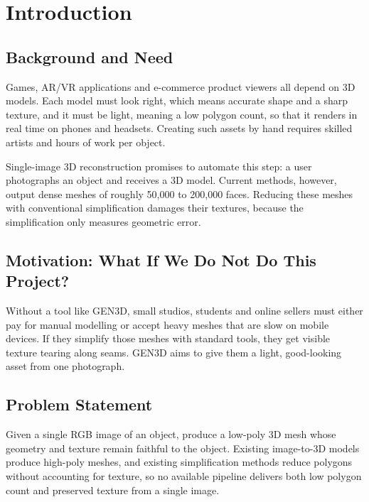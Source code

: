 \chapter{Introduction}

\section{Background and Need}
Games, AR/VR applications and e-commerce product viewers all depend on 3D models. Each model must look right, which means accurate shape and a sharp texture, and it must be light, meaning a low polygon count, so that it renders in real time on phones and headsets. Creating such assets by hand requires skilled artists and hours of work per object.

Single-image 3D reconstruction promises to automate this step: a user photographs an object and receives a 3D model. Current methods, however, output dense meshes of roughly 50{,}000 to 200{,}000 faces. Reducing these meshes with conventional simplification damages their textures, because the simplification only measures geometric error.

\section{Motivation: What If We Do Not Do This Project?}
Without a tool like GEN3D, small studios, students and online sellers must either pay for manual modelling or accept heavy meshes that are slow on mobile devices. If they simplify those meshes with standard tools, they get visible texture tearing along seams. GEN3D aims to give them a light, good-looking asset from one photograph.

\section{Problem Statement}
Given a single RGB image of an object, produce a low-poly 3D mesh whose geometry and texture remain faithful to the object. Existing image-to-3D models produce high-poly meshes, and existing simplification methods reduce polygons without accounting for texture, so no available pipeline delivers both low polygon count and preserved texture from a single image.

